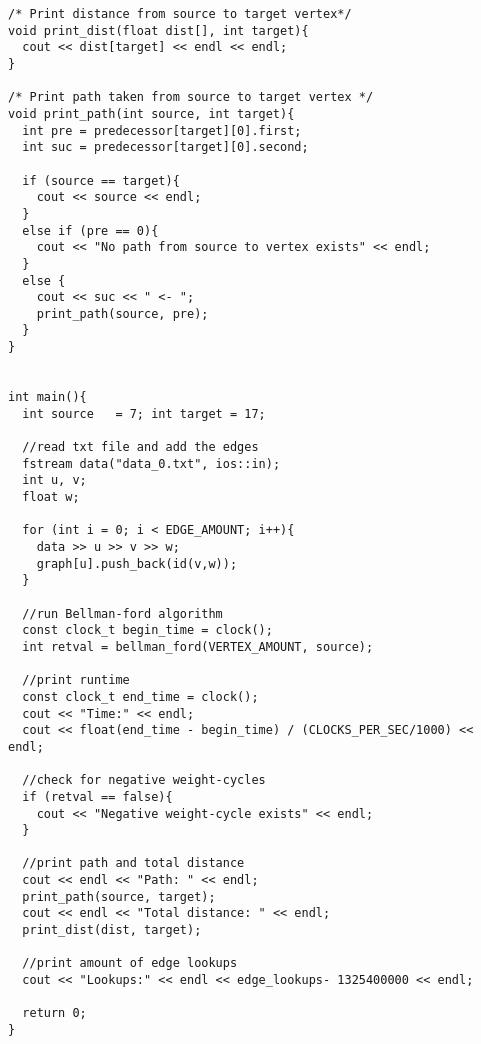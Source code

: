 \documentclass[11pt]{article}
\begin{document}
\begin{lstlisting}
/* Print distance from source to target vertex*/
void print_dist(float dist[], int target){
  cout << dist[target] << endl << endl;
}

/* Print path taken from source to target vertex */
void print_path(int source, int target){
  int pre = predecessor[target][0].first;
  int suc = predecessor[target][0].second;

  if (source == target){
    cout << source << endl;
  }
  else if (pre == 0){
    cout << "No path from source to vertex exists" << endl;
  }
  else {
    cout << suc << " <- ";
    print_path(source, pre);
  }
}


int main(){
  int source   = 7; int target = 17;

  //read txt file and add the edges
  fstream data("data_0.txt", ios::in);
  int u, v;
  float w;

  for (int i = 0; i < EDGE_AMOUNT; i++){
    data >> u >> v >> w;
    graph[u].push_back(id(v,w));
  }

  //run Bellman-ford algorithm
  const clock_t begin_time = clock();
  int retval = bellman_ford(VERTEX_AMOUNT, source);

  //print runtime
  const clock_t end_time = clock();
  cout << "Time:" << endl;
  cout << float(end_time - begin_time) / (CLOCKS_PER_SEC/1000) << endl;

  //check for negative weight-cycles
  if (retval == false){
    cout << "Negative weight-cycle exists" << endl;
  }

  //print path and total distance
  cout << endl << "Path: " << endl;
  print_path(source, target);
  cout << endl << "Total distance: " << endl;
  print_dist(dist, target);

  //print amount of edge lookups
  cout << "Lookups:" << endl << edge_lookups- 1325400000 << endl;

  return 0;
}
\end{lstlisting}
\ \\
\end{document}
